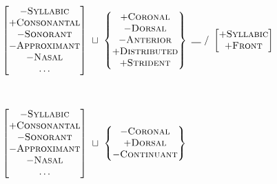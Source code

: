 \documentclass[11pt,letterpaper]{article}
\newcommand{\gap}{\rule{1em}{0.5pt}}
\newcommand{\featspec}[2]{\ensuremath{#1}\textsc{#2}}
\begin{document}
\noindent
\begin{minipage}[t]{.6\textwidth}
\begin{example}
$\begin{bmatrix} 
\featspec{-}{Syllabic} \\ 
\featspec{+}{Consonantal} \\
\featspec{-}{Sonorant} \\ 
\featspec{-}{Approximant} \\
\featspec{-}{Nasal} \\ 
\ldots 
\end{bmatrix}~\sqcup~\begin{Bmatrix}
\featspec{+}{Coronal} \\ 
\featspec{-}{Dorsal} \\
\featspec{-}{Anterior} \\ 
\featspec{+}{Distributed} \\
\featspec{+}{Strident} 
\end{Bmatrix}~\gap~/~\begin{bmatrix}
\featspec{+}{Syllabic} \\ 
\featspec{+}{Front} 
\end{bmatrix}$
\label{e:velar-pal}
\end{example}
\end{minipage}%
~%
\begin{minipage}[t]{.35\textwidth}
\begin{example}
$\begin{bmatrix}
\featspec{-}{Syllabic} \\ 
\featspec{+}{Consonantal} \\
\featspec{-}{Sonorant} \\ 
\featspec{-}{Approximant} \\
\featspec{-}{Nasal} \\ 
\ldots 
\end{bmatrix}~\sqcup~\begin{Bmatrix}
\featspec{-}{Coronal} \\ 
\featspec{+}{Dorsal} \\
\featspec{-}{Continuant} 
\end{Bmatrix}$
\label{e:default}
\end{example}
\end{minipage}
\vspace{\baselineskip}
\end{document}

